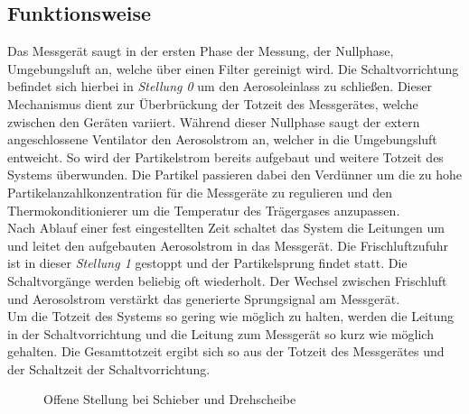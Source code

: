 \subsection{Funktionsweise}
Das Messger\"{a}t saugt in der ersten Phase der Messung, der Nullphase, Umgebungsluft an, welche \"{u}ber einen Filter gereinigt wird. Die Schaltvorrichtung befindet sich hierbei in \textit{Stellung 0} um den Aerosoleinlass zu schlie{\ss}en. Dieser Mechanismus dient zur \"{U}berbr\"{u}ckung der Totzeit des Messger\"{a}tes, welche zwischen den Ger\"{a}ten variiert. W\"{a}hrend dieser Nullphase saugt der extern angeschlossene Ventilator den Aerosolstrom an, welcher in die Umgebungsluft entweicht. So wird der Partikelstrom bereits aufgebaut und weitere Totzeit des Systems \"{u}berwunden. Die Partikel passieren dabei den Verd\"{u}nner um die zu hohe Partikelanzahlkonzentration f\"{u}r die Messger\"{a}te zu regulieren und den Thermokonditionierer um die Temperatur des Tr\"{a}gergases anzupassen\cite{candle}.\\
Nach Ablauf einer fest eingestellten Zeit schaltet das System die Leitungen um und leitet den aufgebauten Aerosolstrom in das Messger\"{a}t. Die Frischluftzufuhr ist in dieser \textit{Stellung 1} gestoppt und der Partikelsprung findet statt. Die Schaltvorg\"{a}nge werden beliebig oft wiederholt. Der Wechsel zwischen Frischluft und Aerosolstrom verst\"{a}rkt das generierte Sprungsignal am Messger\"{a}t.\\
Um die Totzeit des Systems so gering wie m\"{o}glich zu halten, werden die Leitung in der Schaltvorrichtung und die Leitung zum Messger\"{a}t so kurz wie m\"{o}glich gehalten. Die Gesamttotzeit ergibt sich so aus der Totzeit des Messger\"{a}tes und der Schaltzeit der Schaltvorrichtung.
\begin{figure}[H]
        \myfloatalign
         \quad
        \caption[Offene Stellung bei Schieber und Drehscheibe]
        {Offene Stellung bei Schieber und Drehscheibe}
        \label{fig:concepts_4_on}
\end{figure}